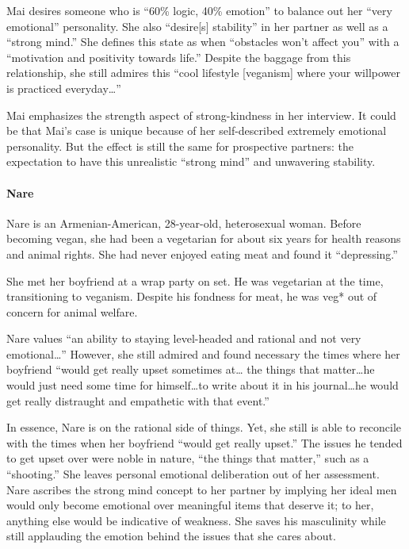 \documentclass[twoside]{report}
\begin{document}
\begin{multicols*}{2}
Mai desires someone who is ``60\% logic, 40\% emotion'' to balance out
her ``very emotional'' personality. She also ``desire{[}s{]} stability''
in her partner as well as a ``strong mind.'' She defines this state as
when ``obstacles won't affect you'' with a ``motivation and positivity
towards life.'' Despite the baggage from this relationship, she still
admires this ``cool lifestyle {[}veganism{]} where your willpower is
practiced everyday\ldots''

Mai emphasizes the strength aspect of strong-kindness in her interview.
It could be that Mai's case is unique because of her self-described
extremely emotional personality. But the effect is still the same for
prospective partners: the expectation to have this unrealistic ``strong
mind'' and unwavering stability.

\paragraph{Nare}

Nare is an Armenian-American, 28-year-old, heterosexual woman. Before
becoming vegan, she had been a vegetarian for about six years for health reasons and animal rights. She had
never enjoyed eating meat and found it ``depressing.''

She met her boyfriend at a wrap party on set. He was vegetarian at the time, transitioning to veganism. Despite his fondness for meat, he was veg* out of concern for animal welfare.

Nare values ``an ability to staying level-headed and rational and not
very emotional\ldots'' However, she still admired and found necessary
the times where her boyfriend ``would get really upset sometimes at\dots
the things that matter\dots he would just need some time for himself\dots to
write about it in his journal\dots he would get really distraught and
empathetic with that event.''

In essence, Nare is on the rational side of things. Yet, she still is
able to reconcile with the times when her boyfriend ``would get really
upset.'' The issues he tended to get upset over were noble in nature,
``the things that matter,'' such as a ``shooting.'' She leaves personal
emotional deliberation out of her assessment. Nare ascribes the strong
mind concept to her partner by implying her ideal men would only become
emotional over meaningful items that deserve it; to her, anything else
would be indicative of weakness. She saves his masculinity while still applauding the emotion behind the issues that she cares about.


\end{multicols*}
\end{document}
